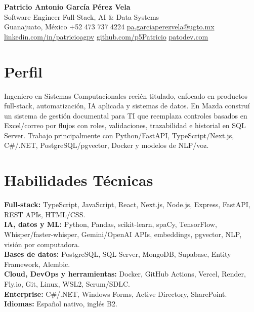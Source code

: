 \documentclass[10pt,letterpaper]{article}
\begin{document}
\pagestyle{empty}
\sffamily

\begin{center}
  {\LARGE\bfseries\color{headingcolor} Patricio Antonio García Pérez Vela}\\[0.18em]
  {\small Software Engineer \textbar{} Full-Stack, AI \& Data Systems}\\[0.28em]
  {\footnotesize Guanajuato, México \textbar{} +52 473 737 4224 \textbar{} \href{mailto:pa.garciaperezvela@ugto.mx}{pa.garciaperezvela@ugto.mx}}\\[0.12em]
  {\footnotesize \href{https://linkedin.com/in/patricioagpv}{linkedin.com/in/patricioagpv} \textbar{} \href{https://github.com/p5Patricio}{github.com/p5Patricio} \textbar{} \href{https://patodev.com/}{patodev.com}}
\end{center}

\vspace{0.08em}

\section{Perfil}
{\small Ingeniero en Sistemas Computacionales recién titulado, enfocado en productos full-stack, automatización, IA aplicada y sistemas de datos. En Mazda construí un sistema de gestión documental para TI que reemplaza controles basados en Excel/correo por flujos con roles, validaciones, trazabilidad e historial en SQL Server. Trabajo principalmente con Python/FastAPI, TypeScript/Next.js, C\#/.NET, PostgreSQL/pgvector, Docker y modelos de NLP/voz.}

\section{Habilidades Técnicas}
{\small
\textbf{Full-stack:} TypeScript, JavaScript, React, Next.js, Node.js, Express, FastAPI, REST APIs, HTML/CSS.\\[0.04em]
\textbf{IA, datos y ML:} Python, Pandas, scikit-learn, spaCy, TensorFlow, Whisper/faster-whisper, Gemini/OpenAI APIs, embeddings, pgvector, NLP, visión por computadora.\\[0.04em]
\textbf{Bases de datos:} PostgreSQL, SQL Server, MongoDB, Supabase, Entity Framework, Alembic.\\[0.04em]
\textbf{Cloud, DevOps y herramientas:} Docker, GitHub Actions, Vercel, Render, Fly.io, Git, Linux, WSL2, Scrum/SDLC.\\[0.04em]
\textbf{Enterprise:} C\#/.NET, Windows Forms, Active Directory, SharePoint. \textbf{Idiomas:} Español nativo, inglés B2.
}
\end{document}
